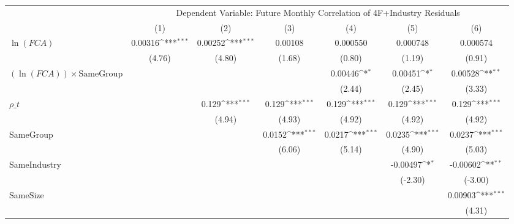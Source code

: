 {
\def\sym#1{\ifmmode^{#1}\else\(^{#1}\)\fi}
\begin{tabular}{l*{6}{c}}
\hline\hline
                &\multicolumn{6}{c}{Dependent Variable: Future Monthly Correlation of 4F+Industry Residuals}                      \\\cmidrule(lr){2-7}
                &\multicolumn{1}{c}{(1)}         &\multicolumn{1}{c}{(2)}         &\multicolumn{1}{c}{(3)}         &\multicolumn{1}{c}{(4)}         &\multicolumn{1}{c}{(5)}         &\multicolumn{1}{c}{(6)}         \\
\hline
$\ln(FCA)$      &  0.00316\sym{***}&  0.00252\sym{***}&  0.00108         & 0.000550         & 0.000748         & 0.000574         \\
                &   (4.76)         &   (4.80)         &   (1.68)         &   (0.80)         &   (1.19)         &   (0.91)         \\
[1em]
$ (\ln(FCA)) \times {\text{SameGroup} }  $ &                  &                  &                  &  0.00446\sym{*}  &  0.00451\sym{*}  &  0.00528\sym{**} \\
                &                  &                  &                  &   (2.44)         &   (2.45)         &   (3.33)         \\
[1em]
 $ {\rho\_t} $   &                  &    0.129\sym{***}&    0.129\sym{***}&    0.129\sym{***}&    0.129\sym{***}&    0.129\sym{***}\\
                &                  &   (4.94)         &   (4.93)         &   (4.92)         &   (4.92)         &   (4.92)         \\
[1em]
SameGroup       &                  &                  &   0.0152\sym{***}&   0.0217\sym{***}&   0.0235\sym{***}&   0.0237\sym{***}\\
                &                  &                  &   (6.06)         &   (5.14)         &   (4.90)         &   (5.03)         \\
[1em]
SameIndustry    &                  &                  &                  &                  & -0.00497\sym{*}  & -0.00602\sym{**} \\
                &                  &                  &                  &                  &  (-2.30)         &  (-3.00)         \\
[1em]
SameSize        &                  &                  &                  &                  &                  &  0.00903\sym{***}\\
                &                  &                  &                  &                  &                  &   (4.31)         \\

\end{tabular}}
